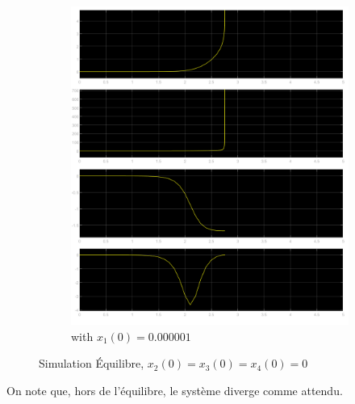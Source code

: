 \documentclass[class=article, crop=false]{standalone}
\begin{document}
\begin{resolution}
\begin{figure}[H]
\begin{subfigure}[b]{0.425\textwidth}
            \includegraphics[width=\textwidth]{../images/simulink_scope20_0_000001.png}
            \caption{with $x_1(0) = 0.000001$}
        \end{subfigure}
        \caption{Simulation Équilibre, $x_2(0) = x_3(0) = x_4(0) = 0$}
        \label{fig:simulink_simulation_équilibre}
    \end{figure}
    On note que, hors de l'équilibre, le système diverge comme attendu.
\end{resolution}

\newpage
\end{document}
